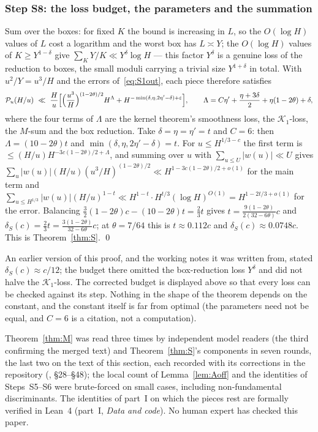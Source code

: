 \documentclass[11pt,a4paper]{article}
\begin{document}
\subsubsection*{Step S8: the loss budget, the parameters and the summation}
Sum over the boxes: for fixed $K$ the bound is increasing in $L$, so the $O(\log H)$ values of $L$ cost a logarithm and the worst box has $L\asymp Y$; the $O(\log H)$ values of
$K\ge Y^{1-\delta}$ give $\sum_KY/K\ll Y^{\delta}\log H$ --- this factor $Y^{\delta}$ is a genuine loss of the reduction to boxes, the small moduli carrying a trivial size $Y^{1+\delta}$
in total. With $u^2/Y=u^3/H$ and the errors of~\eqref{eq:S1out}, each piece therefore satisfies
\[
\mathcal P_u(H/u)\ \ll\ \frac Hu\Bigl[\Bigl(\frac{u^3}H\Bigr)^{(1-2\theta)/2}H^{\Lambda}+H^{-\min(\delta,\eta,2\eta'-\delta)+\varepsilon}\Bigr],\qquad
\Lambda=C\eta'+\frac{\eta+3\delta}2+\eta(1-2\theta)+\delta ,
\]
where the four terms of $\Lambda$ are the kernel theorem's smoothness loss, the $\mathcal K_1$-loss, the $M$-sum and the box reduction. Take $\delta=\eta=\eta'=t$ and $C=6$: then
$\Lambda=(10-2\theta)t$ and $\min(\delta,\eta,2\eta'-\delta)=t$. For $u\le H^{1/3-c}$ the first term is $\le(H/u)H^{-3c(1-2\theta)/2+\Lambda}$, and summing over $u$ with
$\sum_{u\le U}|w(u)|\ll U$ gives $\sum_u|w(u)|(H/u)(u^3/H)^{(1-2\theta)/2}\ll H^{1-3c(1-2\theta)/2+o(1)}$ for the main term and
$\sum_{u\le H^{1/3}}|w(u)|(H/u)^{1-t}\ll H^{1-t}\cdot H^{t/3}(\log H)^{O(1)}=H^{1-2t/3+o(1)}$ for the error. Balancing $\frac32(1-2\theta)c-(10-2\theta)t=\frac23t$ gives
$t=\frac{9(1-2\theta)}{2(32-6\theta)}c$ and $\delta_S(c)=\frac23t=\frac{3(1-2\theta)}{32-6\theta}c$; at $\theta=7/64$ this is $t\approx0.112c$ and $\delta_S(c)\approx0.0748c$.
This is Theorem~\ref{thm:S}. \qed

\begin{remark}
An earlier version of this proof, and the working notes it was written from, stated $\delta_S(c)\approx c/12$; the budget there omitted the box-reduction loss $Y^{\delta}$ and did
not halve the $\mathcal K_1$-loss. The corrected budget is displayed above so that every loss can be checked against its step. Nothing in the shape of the theorem depends on the
constant, and the constant itself is far from optimal (the parameters need not be equal, and $C=6$ is a citation, not a computation).
\end{remark}

\begin{remark}
Theorem~\ref{thm:M} was read three times by independent model readers (the third confirming the merged text) and Theorem~\ref{thm:S}'s components in seven rounds, the last two
on the text of this section, each recorded with its corrections in the repository (, \S28--\S48); the local count of Lemma~\ref{lem:Aoff}
and the identities of Steps~S5--S6 were brute-forced on small cases, including non-fundamental discriminants. The identities of part~I on which the pieces rest are formally
verified in Lean~4 (part~I, \emph{Data and code}). No human expert has checked this paper.
\end{remark}
\end{document}
